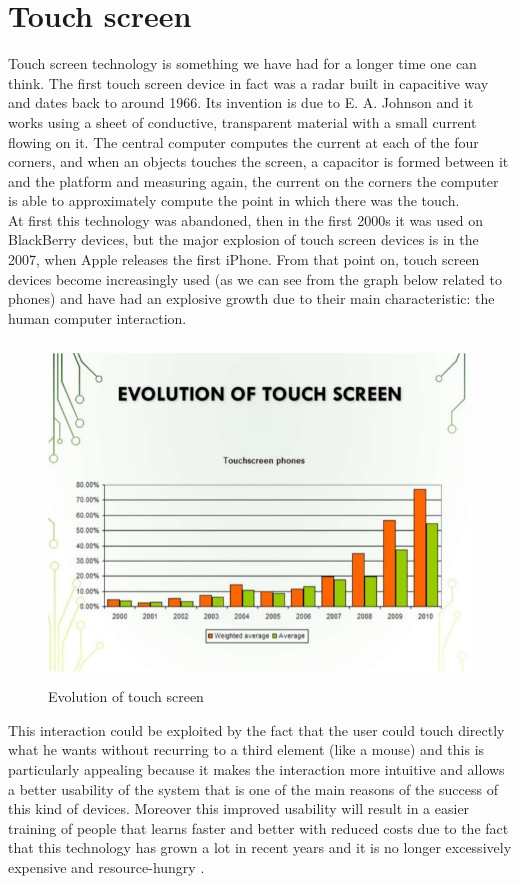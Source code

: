 \section{Touch screen}
Touch screen technology is something we have had for a longer time one can think. The first touch screen device in fact was a radar built in capacitive way and dates back to around 1966. Its invention is due to E. A. Johnson and it works using a sheet of conductive, transparent material with a small current flowing on it. The central computer computes the current at each of the four corners, and when an objects touches the screen, a capacitor is formed between it and the platform and measuring again, the current on the corners the computer is able to approximately compute the point in which there was the touch.\\
At first this technology was abandoned, then in the first 2000s it was used on BlackBerry devices, but the major explosion of touch screen devices is in the 2007, when Apple releases the first iPhone. \cite{Infante}
From that point on, touch screen devices become increasingly used (as we can see from the graph below related to phones) and have had an explosive growth due to their main characteristic: the human computer interaction.
\begin{figure}[H]
\centering
\includegraphics[width=12cm, height=9cm]{immagini/evolutouch.jpg}
\caption{Evolution of touch screen}\label{fig:evolutouch}
\end{figure}
This interaction could be exploited by the fact that the user could touch directly what he wants without recurring to a third element (like a mouse) and this is particularly appealing because it makes the interaction more intuitive and allows a better usability of the system that is one of the main reasons of the success of this kind of devices. Moreover this improved usability will result in a easier training of people that learns faster and better with reduced costs due to the fact that this technology has grown a lot in recent years and it is no longer excessively expensive and resource-hungry \cite{Creed}.

